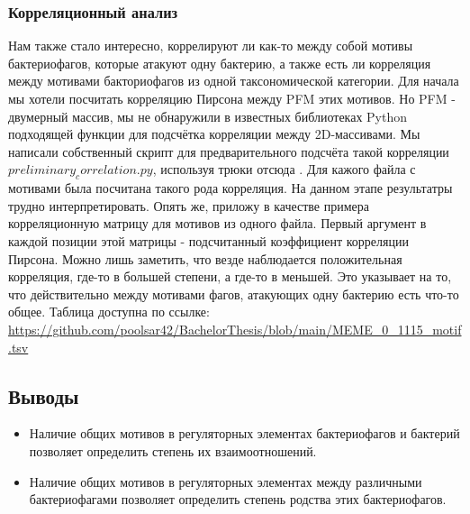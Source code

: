 \documentclass[14pt]{extarticle}
\begin{document}
    \begin{center}
        \item \subsubsection{Корреляционный анализ}
    \end{center}

    \par{Нам также стало интересно, коррелируют ли как-то между собой мотивы бактериофагов, которые атакуют одну 
    бактерию, а также есть ли корреляция между мотивами бакториофагов из одной таксономической категории. Для начала мы 
    хотели посчитать корреляцию Пирсона между PFM этих мотивов. Но PFM - двумерный массив, мы не обнаружили в известных 
    библиотеках Python подходящей функции для подсчётка корреляции между 2D-массивами. Мы написали собственный скрипт 
    для предварительного подсчёта такой корреляции $preliminary_correlation.py$, используя трюки отсюда 
    \cite{stackoverflow}. Для кажого файла с мотивами была посчитана такого рода корреляция. На данном этапе результатры
    трудно интерпретировать. Опять же, приложу в качестве примера корреляционную матрицу для мотивов из одного файла. 
    Первый аргумент в каждой позиции этой матрицы - подсчитанный коэффициент корреляции Пирсона. Можно лишь заметить, 
    что везде наблюдается положительная корреляция, где-то в большей степени, а где-то в меньшей. Это указывает на то, 
    что действительно между мотивами фагов, атакующих одну бактерию есть что-то общее. Таблица доступна по ссылке: 
    \url{https://github.com/poolsar42/BachelorThesis/blob/main/MEME_0_1115_motif.tsv}}
    
    \newpage
    \begin{center}
    \item  \section{Выводы}
    \end{center}
    
    \begin{itemize}
        \item Наличие общих мотивов в регуляторных элементах бактериофагов и бактерий позволяет определить степень их 
        взаимоотношений.
        \item Наличие общих мотивов в регуляторных элементах между различными бактериофагами позволяет определить 
        степень родства этих бактериофагов.
    \end{itemize}
    
\end{document}

